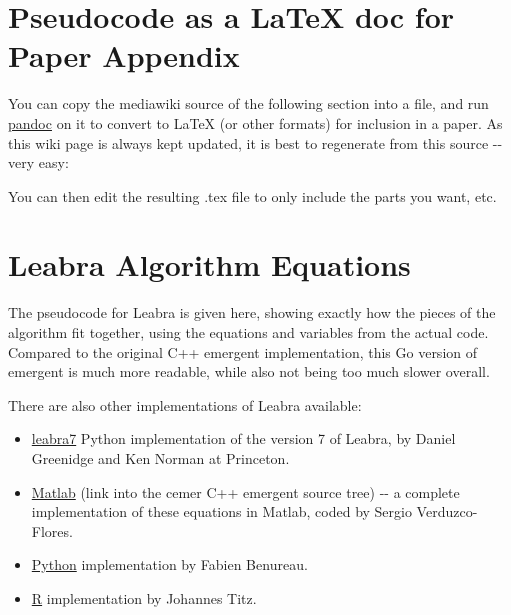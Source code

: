 \hypertarget{pseudocode-as-a-latex-doc-for-paper-appendix}{%
\section{Pseudocode as a LaTeX doc for Paper
Appendix}\label{pseudocode-as-a-latex-doc-for-paper-appendix}}

You can copy the mediawiki source of the following section into a file,
and run \href{https://pandoc.org/}{pandoc} on it to convert to LaTeX (or
other formats) for inclusion in a paper. As this wiki page is always
kept updated, it is best to regenerate from this source -\/- very easy:

\begin{Shaded}
\begin{Highlighting}[]
  
\end{Highlighting}
\end{Shaded}

You can then edit the resulting .tex file to only include the parts you
want, etc.

\hypertarget{leabra-algorithm-equations}{%
\section{Leabra Algorithm Equations}\label{leabra-algorithm-equations}}

The pseudocode for Leabra is given here, showing exactly how the pieces
of the algorithm fit together, using the equations and variables from
the actual code. Compared to the original C++ emergent implementation,
this Go version of emergent is much more readable, while also not being
too much slower overall.

There are also other implementations of Leabra available:

\begin{itemize}
\tightlist
\item
  \href{https://github.com/PrincetonUniversity/leabra7}{leabra7} Python
  implementation of the version 7 of Leabra, by Daniel Greenidge and Ken
  Norman at Princeton.
\item
  \href{https://github.com/emer/cemer/blob/master/Matlab/}{Matlab} (link
  into the cemer C++ emergent source tree) -\/- a complete
  implementation of these equations in Matlab, coded by Sergio
  Verduzco-Flores.
\item
  \href{https://github.com/benureau/leabra}{Python} implementation by
  Fabien Benureau.
\item
  \href{https://github.com/johannes-titz/leabRa}{R} implementation by
  Johannes Titz.
\end{itemize}

